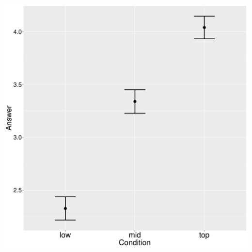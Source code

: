 \documentclass[ignorenonframetext,]{beamer}
\begin{document}
\begin{frame}

\begin{center}
\includegraphics[scale=0.23]{exp1-part_1-errorbars.pdf}
\end{center}

\end{frame}
\end{document}
